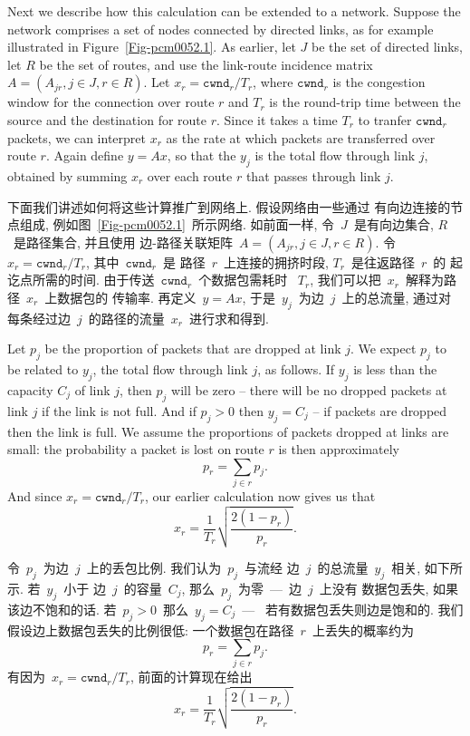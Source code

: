\documentclass[a4paper,12pt, twocolumn]{article}
\begin{document}
Next we describe how this calculation can be extended
to a network. Suppose the network comprises a set of nodes
connected by directed links, as for example illustrated in
Figure~\ref{Fig-pcm0052.1}. As earlier, let $J$ be the 
set of directed links, let $R$ be the set of routes,
and use the link-route incidence 
matrix $A = (A_{jr}, j \in J,  r \in R)$.
Let $x_r = \texttt{cwnd}_r / T_r$, where $\texttt{cwnd}_r$ is
the congestion window for the connection over route $r$ and $T_r$
is the round-trip time between the
source and the destination for route $r$. Since it takes a time
$T_r$ to tranfer $\texttt{cwnd}_r$ packets,
we can interpret $x_r$ as the rate
at which packets are transferred over route $r$. 
Again define $y =Ax$, so that the $y_j$ is the 
total flow through link $j$, obtained by summing $x_r$
over each route $r$ that passes through link $j$. 

下面我们讲述如何将这些计算推广到网络上. 假设网络由一些通过
有向边连接的节点组成, 例如图~\ref{Fig-pcm0052.1}~所示网络. 
如前面一样, 令~$J$~是有向边集合, $R$~是路径集合, 并且使用
边-路径关联矩阵~$A = (A_{jr}, j \in J,  r \in R)$. 
令~$x_r = \texttt{cwnd}_r / T_r$, 其中~$\texttt{cwnd}_r$~是
路径~$r$~上连接的拥挤时段, $T_{r}$~是往返路径~$r$~的
起讫点所需的时间. 由于传送~$\texttt{cwnd}_r$~个数据包需耗时
~$T_{r}$, 我们可以把~$x_{r}$~解释为路径~$x_{r}$~上数据包的
传输率. 再定义~$y = Ax$, 于是~$y_{j}$~为边~$j$~上的总流量, 
通过对每条经过边~$j$~的路径的流量~$x_{r}$~进行求和得到. 

Let $p_j$ be the proportion
of packets that are dropped at link $j$. We expect $p_j$ to
be related to $y_j$, the total flow through link $j$, as follows.
If $y_j$ is less than the capacity $C_j$ of link $j$, then
$p_j$ will be zero -- there will be no dropped packets
at link $j$ if the link is not full. And
if $p_j>0$ then $y_j=C_j$ -- if packets are dropped then
the link is full. 
We assume the proportions of packets dropped at links 
are small: the probability a packet is lost on route $r$
is then approximately
\[
p_r = \sum_{j\in r} p_j.
\]
And since $x_r = \texttt{cwnd}_r / T_r$, our earlier
calculation now gives us that
\[
  x_r = \frac{1}{T_r} \sqrt{\frac{2(1-p_r)}{p_r }}.
\]

令~$p_{j}$~为边~$j$~上的丢包比例. 我们认为~$p_{j}$~与流经
边~$j$~的总流量~$y_{j}$~相关, 如下所示. 若~$y_{j}$~小于
边~$j$~的容量~$C_{j}$, 那么~$p_{j}$~为零~---~边~$j$~上没有
数据包丢失, 如果该边不饱和的话. 若~$p_j>0$~那么~$y_j=C_j$~---~
若有数据包丢失则边是饱和的. 我们假设边上数据包丢失的比例很低: 
一个数据包在路径~$r$~上丢失的概率约为
\[
p_r = \sum_{j\in r} p_j.
\]
有因为~$x_r = \texttt{cwnd}_r / T_r$, 前面的计算现在给出
\[
  x_r = \frac{1}{T_r} \sqrt{\frac{2(1-p_r)}{p_r }}.
\]
\end{document}
